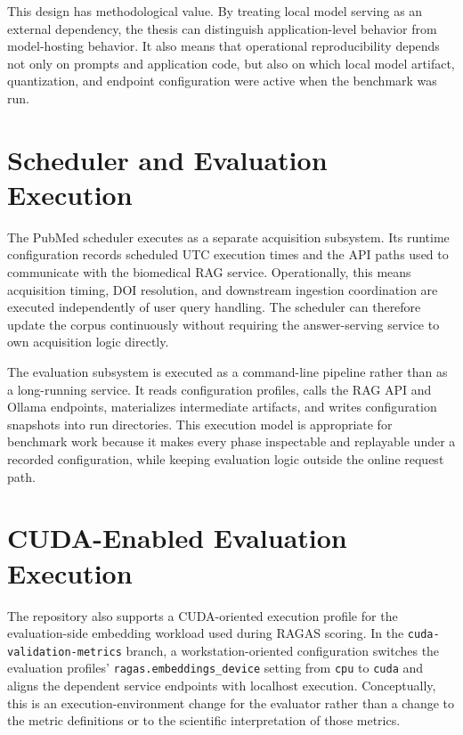 This design has methodological value. By treating local model serving as an external dependency, the thesis can distinguish application-level behavior from model-hosting behavior. It also means that operational reproducibility depends not only on prompts and application code, but also on which local model artifact, quantization, and endpoint configuration were active when the benchmark was run.

\section{Scheduler and Evaluation Execution}

The PubMed scheduler executes as a separate acquisition subsystem. Its runtime configuration records scheduled UTC execution times and the API paths used to communicate with the biomedical RAG service. Operationally, this means acquisition timing, DOI resolution, and downstream ingestion coordination are executed independently of user query handling. The scheduler can therefore update the corpus continuously without requiring the answer-serving service to own acquisition logic directly.

The evaluation subsystem is executed as a command-line pipeline rather than as a long-running service. It reads configuration profiles, calls the RAG API and Ollama endpoints, materializes intermediate artifacts, and writes configuration snapshots into run directories. This execution model is appropriate for benchmark work because it makes every phase inspectable and replayable under a recorded configuration, while keeping evaluation logic outside the online request path.

\section{CUDA-Enabled Evaluation Execution}

The repository also supports a CUDA-oriented execution profile for the evaluation-side embedding workload used during RAGAS scoring. In the \texttt{cuda-validation-metrics} branch, a workstation-oriented configuration switches the evaluation profiles' \texttt{ragas.embeddings\_device} setting from \texttt{cpu} to \texttt{cuda} and aligns the dependent service endpoints with localhost execution. Conceptually, this is an execution-environment change for the evaluator rather than a change to the metric definitions or to the scientific interpretation of those metrics.

